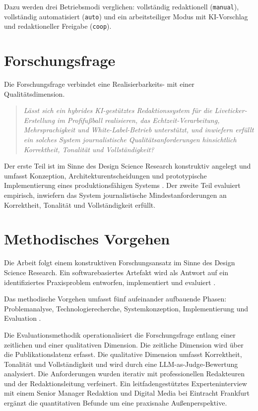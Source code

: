 Dazu werden drei Betriebsmodi verglichen: vollständig redaktionell (\texttt{manual}), vollständig automatisiert (\texttt{auto}) und ein arbeitsteiliger Modus mit KI-Vorschlag und redaktioneller Freigabe (\texttt{coop}).


\section{Forschungsfrage}\label{forschungsfrage}

Die Forschungsfrage verbindet eine Realisierbarkeits- mit einer Qualitätsdimension.

\begin{quote}
\emph{Lässt sich ein hybrides KI-gestütztes Redaktionssystem für die
Liveticker-Erstellung im Profifußball realisieren, das
Echtzeit-Verarbeitung, Mehrsprachigkeit und White-Label-Betrieb
unterstützt, und inwiefern erfüllt ein solches System journalistische
Qualitätsanforderungen hinsichtlich Korrektheit, Tonalität und
Vollständigkeit?}
\end{quote}

Der erste Teil ist im Sinne des Design Science Research \cite{hevner2004} konstruktiv angelegt und umfasst Konzeption, Architekturentscheidungen und prototypische Implementierung eines produktionsfähigen Systems \cite{designresearch}. Der zweite Teil evaluiert empirisch, inwiefern das System journalistische Mindestanforderungen an Korrektheit, Tonalität und Vollständigkeit erfüllt.


\section{Methodisches Vorgehen}\label{methodisches-vorgehen}

Die Arbeit folgt einem konstruktiven Forschungsansatz im Sinne des
Design Science Research. Ein
softwarebasiertes Artefakt wird als Antwort auf ein identifiziertes
Praxisproblem entworfen, implementiert und evaluiert \cite{hevner2004}.

Das methodische Vorgehen umfasst fünf aufeinander aufbauende Phasen: Problemanalyse, Technologierecherche, Systemkonzeption, Implementierung und Evaluation \cite{designresearch}.

Die Evaluationsmethodik operationalisiert die Forschungsfrage entlang einer zeitlichen und einer qualitativen Dimension. Die zeitliche Dimension wird über die Publikationslatenz erfasst. Die qualitative Dimension umfasst Korrektheit, Tonalität und Vollständigkeit und wird durch eine LLM-as-Judge-Bewertung analysiert. Die Anforderungen wurden iterativ mit professionellen Redakteuren und der Redaktionsleitung verfeinert. Ein leitfadengestütztes Experteninterview mit einem Senior Manager Redaktion und Digital Media bei Eintracht Frankfurt ergänzt die quantitativen Befunde um eine praxisnahe Außenperspektive.

